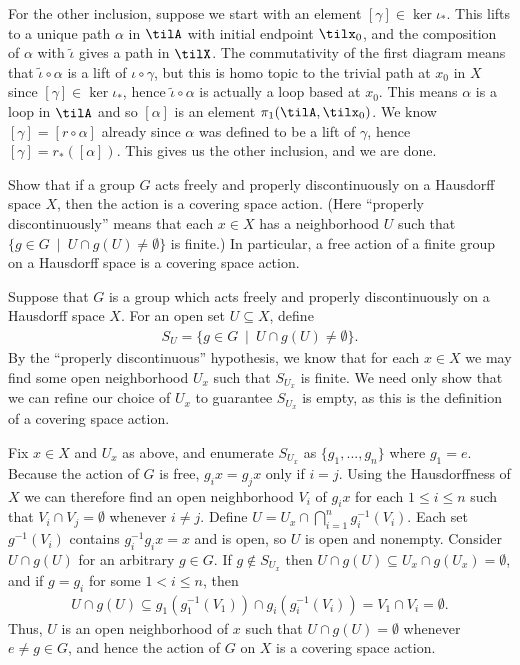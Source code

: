 \begin{homework}[e]
\begin{prf}
    For the other inclusion, suppose we start with an element $[\gamma] \in \ker \iota_*$. This lifts to a unique path $\alpha$ in $\tilA$ with initial endpoint $\tilx_0$, and the composition of $\alpha$ with $\tilde{\iota}$ gives a path in $\tilX$. The commutativity of the first diagram means that $\tilde{\iota}\circ \alpha$ is a lift of $\iota\circ \gamma$, but this is homo topic to the trivial path at $x_0$ in $X$ since $[\gamma] \in \ker \iota_*$, hence $\tilde{\iota}\circ \alpha$ is actually a loop based at $x_0$. This means $\alpha$ is a loop in $\tilA$ and so $[\alpha]$ is an element $\pi_1(\tilA,\tilx_0)$. We know $[\gamma] = [r\circ \alpha]$ already since $\alpha$ was defined to be a lift of $\gamma$, hence $[\gamma] = r_*([\alpha])$. This gives us the other inclusion, and we are done.
  \end{prf}
   Show that if a group $G$ acts freely and properly discontinuously on a Hausdorff space $X$, then the action is a covering space action. (Here ``properly discontinuously'' means that each $x \in X$ has a neighborhood $U$ such that $\{g \in G ~\mid~ U\cap g(U) \neq \emptyset\}$ is finite.) In particular, a free action of a finite group on a Hausdorff space is a covering space action.
  \begin{prf}
    Suppose that $G$ is a group which acts freely and properly discontinuously on a Hausdorff space $X$. For an open set $U\subseteq X$, define
    \begin{align*}
      S_U = \{g \in G~\mid~ U\cap g(U) \neq \emptyset\}.
    \end{align*}
    By the ``properly discontinuous'' hypothesis, we know that for each $x \in X$ we may find some open neighborhood $U_x$ such that $S_{U_x}$ is finite. We need only show that we can refine our choice of $U_x$ to guarantee $S_{U_x}$ is empty, as this is the definition of a covering space action.

    Fix $x \in X$ and $U_x$ as above, and enumerate $S_{U_x}$ as $\{g_1,...,g_n\}$ where $g_1 = e$. Because the action of $G$ is free, $g_ix = g_jx$ only if $i = j$. Using the Hausdorffness of $X$ we can therefore find an open neighborhood $V_i$ of $g_ix$ for each $1\leq i\leq n$ such that $V_i \cap V_j = \emptyset$ whenever $i\neq j$. Define $U = U_x \cap \bigcap_{i=1}^n g^{-1}_i(V_i)$. Each set $g^{-1}(V_i)$ contains $g^{-1}_ig_ix = x$ and is open, so $U$ is open and nonempty. Consider $U\cap g(U)$ for an arbitrary $g \in G$. If $g\not\in S_{U_x}$ then $U\cap g(U) \subseteq U_x\cap g(U_x) = \emptyset$, and if $g = g_i$ for some $1< i\leq n$, then
    \begin{align*}
      U \cap g(U) \subseteq g_1(g_1^{-1}(V_1)) \cap g_i(g_i^{-1}(V_i)) = V_1 \cap V_i = \emptyset.
    \end{align*}
    Thus, $U$ is an open neighborhood of $x$ such that $U\cap g(U) = \emptyset$ whenever $e \neq g \in G$, and hence the action of $G$ on $X$ is a covering space action.


\end{prf}
\end{homework}
